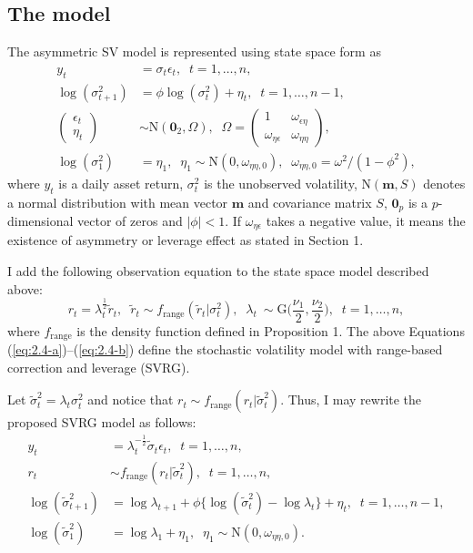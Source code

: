 \documentclass[11pt]{article}
\begin{document}
\subsection{The model}
The asymmetric SV model is represented using state space form as
\begin{align}
y_t &=\sigma_t\epsilon_t, \;\; t=1, \ldots, n, \label{eq:2.4-a} \\
\log(\sigma_{t+1}^2) &= \phi\log(\sigma_t^2) +\eta_t,  \;\; t=1, \ldots, n-1, \\
\begin{pmatrix} \epsilon_t \\ \eta_t \end{pmatrix} 
&\sim \mathrm{N}(\bm{0}_2, \Omega), \;\; 
\Omega =\begin{pmatrix} 1 & \omega_{\epsilon\eta} \\ \omega_{\eta\epsilon} & \omega_{\eta\eta} \end{pmatrix}, \\
\log(\sigma_{1}^2) &= \eta_1, \;\; \eta_1 \sim\mathrm{N}(0, \omega_{\eta\eta, 0}), \;\; \omega_{\eta\eta, 0} =\omega^2/(1-\phi^2), 
\end{align}
where $y_t$ is a daily asset return, $\sigma^2_t$ is the unobserved volatility, 
$\mathrm{N}(\bm{m}, S)$ denotes a normal distribution with mean vector $\bm{m}$ and covariance matrix $S$, $\bm{0}_p$ is a $p$-dimensional vector of zeros and $|\phi|<1$. 
If $\omega_{\eta\epsilon}$ takes a negative value, it means the existence of asymmetry or leverage effect as stated in Section 1. 

I add the following observation equation to the state space model described above: 
\begin{equation} \label{eq:2.4-b} 
r_t =\lambda_t^{\frac{1}{2}} \widetilde{r}_t, \;\; \widetilde{r}_t \sim f_{\mathrm{range}}(\widetilde{r}_t|\sigma^2_t), \;\; \lambda_t ~\sim\mathrm{G}\Big(\frac{\nu_1}{2}, \frac{\nu_2}{2}\Big), \;\; t=1, \ldots, n, 
\end{equation}
where $f_{\mathrm{range}}$ is the density function defined in Proposition 1. 
The above Equations (\ref{eq:2.4-a})--(\ref{eq:2.4-b}) define the stochastic volatility model with range-based correction and leverage (SVRG). 

Let $\widetilde{\sigma}^2_t =\lambda_t\sigma^2_t$ and notice that $r_t \sim f_{\mathrm{range}}(r_t |\widetilde{\sigma}^2_t)$. 
Thus, I may rewrite the proposed SVRG model as follows: 
\begin{align}
y_t &=\lambda_t^{-\frac{1}{2}}\widetilde{\sigma}_t\epsilon_t, \;\; t=1, \ldots, n, \\
r_t &\sim f_{\mathrm{range}}(r_t |\widetilde{\sigma}^2_t), \;\; t=1, \ldots, n, \\
\log(\widetilde{\sigma}_{t+1}^2) &= \log\lambda_{t+1} +\phi\{\log(\widetilde{\sigma}_t^2) -\log\lambda_t\} +\eta_t,  \;\; t=1, \ldots, n-1, \\
\log(\widetilde{\sigma}_{1}^2) &= \log\lambda_1 +\eta_1, \;\; \eta_1 \sim\mathrm{N}(0, \omega_{\eta\eta, 0}). 
\end{align}
\end{document}
